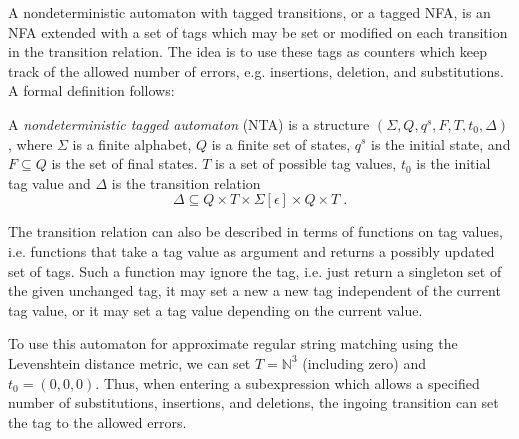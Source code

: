 A nondeterministic automaton with tagged transitions, or a tagged NFA, is an
NFA extended with a set of tags which may be set or modified on each transition
in the transition relation. The idea is to use these tags as counters which
keep track of the allowed number of errors, e.g.  insertions, deletion, and
substitutions. A formal definition follows:


\begin{definition}[NTA] 
  A \emph{nondeterministic tagged automaton} (NTA) is a structure
  $(\Sigma, Q, q^s, F, T, t_0, \Delta)$, where $\Sigma$ is a finite alphabet,
  $Q$ is a finite set of states, $q^s$ is the initial state, and
  $F \subseteq Q$ is the set of final states. $T$ is a set of possible tag
  values, $t_0$ is the initial tag value and $\Delta$ is the transition
  relation
  \[
    \Delta \subseteq Q \times T \times \Sigma[\epsilon] \times Q \times T \;.
  \]
\end{definition}

The transition relation can also be described in terms of functions on tag
values, i.e. functions that take a tag value as argument and returns a possibly
updated set of tags. Such a function may ignore the tag, i.e. just return a
singleton set of the given unchanged tag, it may set a new a new tag
independent of the current tag value, or it may set a tag value depending on
the current value.

To use this automaton for approximate regular string matching using the
Levenshtein distance metric, we can set $T = \mathbb{N}^3$ (including zero) and
$t_0 = (0,0,0)$. Thus, when entering a subexpression which allows a specified
number of substitutions, insertions, and deletions, the ingoing transition can
set the tag to the allowed errors.


